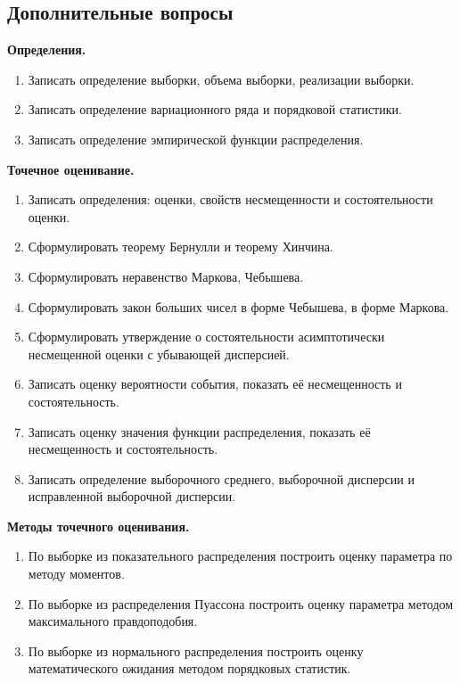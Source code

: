 \documentclass[a4paper,12pt]{article}
\newcommand{\theme}[1]{\hfil \textbf{#1} \hfil}
\begin{document}
\subsection{Дополнительные вопросы}

\theme{Определения.}
\begin{enumerate}
    \item Записать определение выборки, объема выборки, реализации выборки.
    \item Записать определение вариационного ряда и порядковой статистики.
    \item Записать определение эмпирической функции распределения.
\end{enumerate}

\theme{Точечное оценивание.}
\begin{enumerate}[resume]
    \item Записать определения: оценки, свойств несмещенности и состоятельности оценки.
    \item Сформулировать теорему Бернулли и теорему Хинчина.
    \item Сформулировать неравенство Маркова, Чебышева.
    \item Сформулировать закон больших чисел в форме Чебышева, в форме Маркова.
    \item Сформулировать утверждение о состоятельности асимптотически несмещенной оценки с убывающей дисперсией.
    \item Записать оценку вероятности события, показать её несмещенность и состоятельность.
    \item Записать оценку значения функции распределения, показать её несмещенность и состоятельность.
    \item Записать определение выборочного среднего, выборочной дисперсии и исправленной выборочной дисперсии.
\end{enumerate}

\theme{Методы точечного оценивания.}
\begin{enumerate}[resume]
    \item По выборке из показательного распределения построить оценку параметра по методу моментов.
    \item По выборке из распределения Пуассона построить оценку параметра методом максимального правдоподобия.
    \item По выборке из нормального распределения построить оценку математического ожидания методом порядковых статистик.
\end{enumerate}
\end{document}
